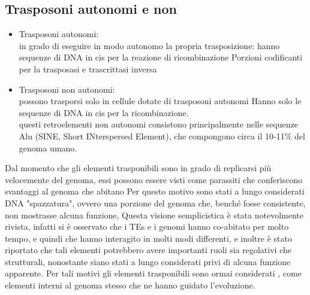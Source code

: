 \documentclass{article}
\begin{document}
\subsection{Trasposoni autonomi e non}
\begin{itemize}
    \item Trasposoni autonomi:\\
    in grado di eseguire in modo autonomo la propria trasposizione: hanno
    sequenze di DNA in cis per la reazione di ricombinazione
    Porzioni codificanti per la trasposasi e trascrittasi inversa
    \item Trasposoni non autonomi:\\
    possono trasporsi solo in cellule dotate di trasposoni autonomi
    Hanno solo le sequenze di DNA in cis per la ricombinazione.\\
    questi retroelementi non autonomi
    consistono principalmente nelle sequenze
    Alu (SINE, Short INterspersed Element),
    che compongono circa il 10-11$\%$ del genoma umano.
\end{itemize}
Dal momento che gli elementi trasponibili sono in grado di replicarsi più
velocemente del genoma, essi possono essere visti come parassiti che conferiscono
svantaggi al genoma che abitano
Per questo motivo sono stati a lungo considerati DNA "spazzatura", ovvero una
porzione del genoma che, benché fosse consistente, non mostrasse alcuna
funzione,
Questa visione semplicistica è stata notevolmente rivista, infatti si è osservato che i
TEs e i genomi hanno co-abitato per molto tempo, e quindi che hanno interagito
in molti modi differenti, e inoltre è stato riportato che tali elementi potrebbero
avere importanti ruoli sia regolativi che strutturali, nonostante siano stati a lungo
considerati privi di alcuna funzione apparente.
Per tali motivi gli elementi trasponibili sono ormai considerati , come elementi
interni al genoma stesso che ne hanno guidato l'evoluzione.
\end{document}
